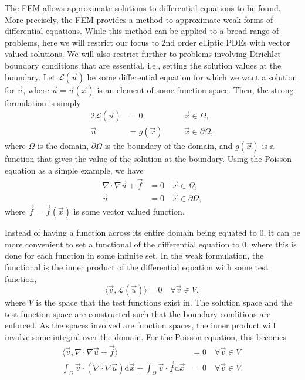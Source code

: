 The \ac{FEM} allows approximate solutions to differential equations to be found.
More precisely, the \ac{FEM} provides a method to approximate weak forms of differential equations.
While this method can be applied to a broad range of problems, here we will restrict our focus to 2nd order elliptic \acp{PDE} with vector valued solutions.
We will also restrict further to problems involving Dirichlet boundary conditions that are essential, i.e., setting the solution values at the boundary.
Let $\mathcal{L}(\vec{u})$ be some differential equation for which we want a solution for $\vec{u}$, where $\vec{u} = \vec{u}(\vec{x})$ is an element of some function space.
Then, the strong formulation is simply
\begin{alignat}{2}
    \mathcal{L}(\vec{u}) &= 0 \quad &&\vec{x} \in \Omega, \nonumber\\
    \vec{u} &= g(\vec{x}) \quad &&\vec{x} \in \partial \Omega,
\end{alignat}
where $\Omega$ is the domain, $\partial \Omega$ is the boundary of the domain, and $g(\vec{x})$ is a function that gives the value of the solution at the boundary.
Using the Poisson equation as a simple example, we have
\begin{align}
    \nabla \cdot \nabla \vec{u} + \vec{f} &= 0 \quad \vec{x} \in \Omega, \nonumber\\
                                     \vec{u} &= 0 \quad \vec{x} \in \partial \Omega,
\end{align}
where $\vec{f} = \vec{f}(\vec{x})$ is some vector valued function.

Instead of having a function across its entire domain being equated to 0, it can be more convenient to set a functional of the differential equation to 0, where this is done for each function in some infinite set.
In the weak formulation, the functional is the inner product of the differential equation with some test function,
\begin{equation}
    \langle \vec{v}, \mathcal{L}(\vec{u}) \rangle = 0 \quad \forall \vec{v} \in V,
\end{equation}
where $V$ is the space that the test functions exist in.
The solution space and the test function space are constructed such that the boundary conditions are enforced.
As the spaces involved are function spaces, the inner product will involve some integral over the domain.
For the Poisson equation, this becomes
\begin{align}
    \langle \vec{v}, \nabla \cdot \nabla \vec{u} + \vec{f} \rangle &= 0 \quad \forall \vec{v} \in V \nonumber\\
    \int_{\Omega} \vec{v} \cdot (\nabla \cdot \nabla \vec{u}) \mathrm{d} \vec{x} + \int_{\Omega} \vec{v} \cdot \vec{f} \mathrm{d} \vec{x} &= 0 \quad \forall \vec{v} \in V. \label{eq:poisson-weak-formulation}
\end{align}

